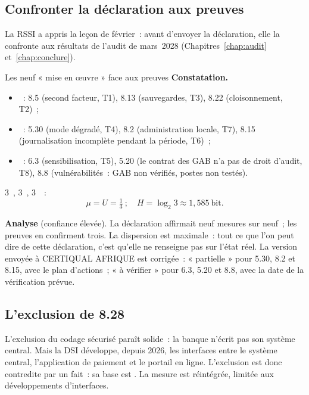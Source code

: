 \subsection{Confronter la déclaration aux preuves}

La RSSI a appris la leçon de février~: avant d'envoyer la déclaration,
elle la confronte aux résultats de l'audit de mars~2028
(Chapitres~\ref{chap:audit} et~\ref{chap:conclure}).

\begin{boxlecture}{Les neuf « mise en œuvre » face aux preuves}
\textbf{Constatation.}
\begin{itemize}
    \item \OUI{}~: 8.5 (second facteur, T1), 8.13 (sauvegardes, T3), 8.22
          (cloisonnement, T2)~;
    \item \NON{}~: 5.30 (mode dégradé, T4), 8.2 (administration locale,
          T7), 8.15 (journalisation incomplète pendant la période, T6)~;
    \item \NEK{}~: 6.3 (sensibilisation, T5), 5.20 (le contrat des GAB n'a
          pas de droit d'audit, T8), 8.8 (vulnérabilités~: GAB non vérifiés,
          postes non testés).
\end{itemize}
3~\OUI{}, 3~\NON{}, 3~\NEK{}~:
\[
\mu = U = \tfrac{1}{3}~;\quad
H = \log_2 3 \approx 1{,}585~\text{bit}.
\]

\textbf{Analyse} (confiance élevée). La déclaration affirmait neuf mesures
sur neuf~; les preuves en confirment trois. La dispersion est maximale~:
tout ce que l'on peut dire de cette déclaration, c'est qu'elle ne
renseigne pas sur l'état réel. La version envoyée à CERTIQUAL AFRIQUE est
corrigée~: « partielle » pour 5.30, 8.2 et 8.15, avec le plan d'actions~;
« à vérifier » pour 6.3, 5.20 et 8.8, avec la date de la vérification
prévue.

\medskip
\hfill{}
\end{boxlecture}

\subsection{L'exclusion de 8.28}

L'exclusion du codage sécurisé paraît solide~: la banque n'écrit pas son
système central. Mais la DSI développe, depuis 2026, les interfaces entre
le système central, l'application de paiement et le portail en ligne.
L'exclusion est donc contredite par un fait~: sa base est \NON{}. La mesure
est réintégrée, limitée aux développements d'interfaces.

